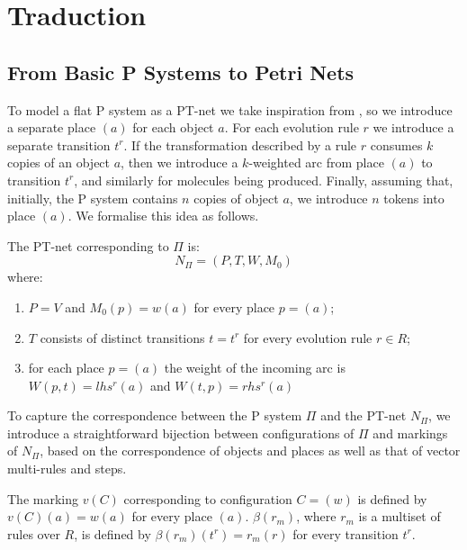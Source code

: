 \chapter{Traduction}

\section{From Basic P Systems to Petri Nets}
\label{sec:basic_p_to_pt}

To model a flat P system as a PT-net we take inspiration from \cite{kleijn2008petri}, so we introduce a separate place $(a)$ for each object $a$. 
For each evolution rule $r$ we introduce a separate transition $t^r$.
If the transformation described by a rule $r$ consumes $k$ copies of an object $a$, then we introduce a $k$-weighted arc from place $(a)$ to transition $t^r$, and similarly for molecules being produced.
Finally, assuming that, initially, the P system contains $n$ copies of object $a$, we introduce $n$ tokens into place $(a)$.
We formalise this idea as follows.

\begin{definition}
\label{def:def_tr_basic}
The PT-net corresponding to $\Pi$ is:
\[ N_\Pi = (P,T,W,M_0) \]
where:
\begin{enumerate}
    \item $P=V$ and $M_0(p)=w(a)$ for every place $p=(a)$;
    \item $T$ consists of distinct transitions $t=t^r$ for every evolution rule $r \in R$;
    \item for each place $p=(a)$ the weight of the incoming arc is $W(p,t)=lhs^r(a)$ and 
    $W(t,p)=rhs^r(a)$
\end{enumerate}
\end{definition}

To capture the correspondence between the P system $\Pi$ and the PT-net $N_\Pi$, we introduce a straightforward bijection between configurations of $\Pi$ and markings of $N_\Pi$, based on the correspondence of objects and places as well as that of vector multi-rules and steps.

\begin{definition}
\label{def:map_conf}
The marking $v(C)$ corresponding to configuration $C=(w)$ is defined by $v(C)(a)=w(a)$ for every place $(a)$.   
$\beta(r_m)$, where $r_m$ is a multiset of rules over $R$, is defined by 
$\beta(r_m)(t^r)=r_m(r)$ for every transition $t^r$.  
\end{definition}

